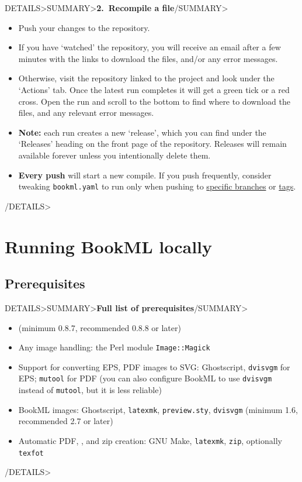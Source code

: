 \documentclass[a4paper,british]{article}
\newenvironment{foldedframe}[1][]{%
    \<DETAILS>\<SUMMARY>\textbf{#1}\</SUMMARY>}%
  {\</DETAILS>}
\newenvironment{foldedframe}[1][]{\bgroup\colorlet{TFFrameColor}{SpringGreen}
  \colorlet{TFTitleColor}{black}\begin{titled-frame}{#1}}{\end{titled-frame}\egroup}
\begin{document}
\begin{foldedframe}[2.\ Recompile a file]
  \begin{itemize}
    \item Push your changes to the repository.
    \item If you have `watched' the repository, you will receive an email after a few minutes with the links to download the files, and/or any error messages.
    \item Otherwise, visit the repository linked to the project and look under the `Actions' tab. Once the latest run completes it will get a green tick or a red cross. Open the run and scroll to the bottom to find where to download the files, and any relevant error messages.
    \item \textbf{Note:} each run creates a new `release', which you can find under the `Releases' heading on the front page of the repository. Releases will remain available forever unless you intentionally delete them.
    \item \textbf{Every push} will start a new compile. If you push frequently, consider tweaking \texttt{bookml.yaml} to run only when pushing to \href{https://docs.github.com/en/actions/reference/workflows-and-actions/events-that-trigger-workflows#running-your-workflow-only-when-a-push-to-specific-branches-occurs}{specific branches} or \href{https://docs.github.com/en/actions/reference/workflows-and-actions/events-that-trigger-workflows#running-your-workflow-only-when-a-push-of-specific-tags-occurs}{tags}.
  \end{itemize}
\end{foldedframe}


\section{Running BookML locally}\label{running-bookml-locally}
\subsection{Prerequisites}\label{prerequisites}

\begin{foldedframe}[Full list of prerequisites]
  \begin{itemize}
    \item \LaTeXML{} (minimum 0.8.7, recommended 0.8.8 or later)
    \item Any image handling: the Perl module \texttt{Image::Magick}
    \item Support for converting EPS, PDF images to SVG: Ghostscript, \texttt{dvisvgm} for EPS; \texttt{mutool} for PDF (you can also configure BookML to use \texttt{dvisvgm} instead of \texttt{mutool}, but it is less reliable)
    \item BookML images: Ghostscript, \texttt{latexmk}, \texttt{preview.sty}, \texttt{dvisvgm} (minimum 1.6, recommended 2.7 or later)
    \item Automatic PDF, \HTML, and zip creation: GNU Make, \texttt{latexmk}, \texttt{zip}, optionally \texttt{texfot}
  \end{itemize}
\end{foldedframe}
\end{document}
